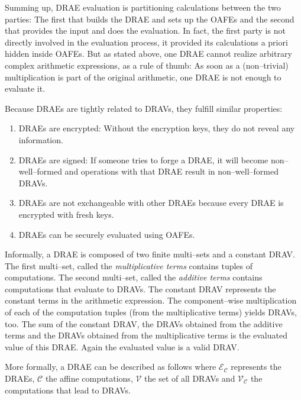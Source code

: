 Summing up, DRAE evaluation is partitioning calculations between the two
parties: The first that builds the DRAE and sets up the OAFEs and the second
that provides the input and does the evaluation. In fact, the first party is not
directly involved in the evaluation process, it provided its calculations a
priori hidden inside OAFEs. But as stated above, one DRAE cannot realize
arbitrary complex arithmetic expressions, as a rule of thumb: As soon as a
(non--trivial) multiplication is part of the original arithmetic, one DRAE is
not enough to evaluate it.



Because DRAEs are tightly related to DRAVs, they fulfill similar properties:

\begin{enumerate}

  \item \label{prop:drae-encrypted} DRAEs are encrypted: Without the encryption
    keys, they do not reveal any information.

  \item \label{prop:drae-signed} DRAEs are signed: If someone tries to forge a
    DRAE, it will become non--well--formed and operations with that DRAE result
    in non--well--formed DRAVs.

  \item DRAEs are not exchangeable with other DRAEs because every DRAE is
    encrypted with fresh keys.

  \item \label{prop:drae-oafe} DRAEs can be securely evaluated using OAFEs.

\end{enumerate}

\noindent{}Informally, a DRAE is composed of two finite multi--sets and a
constant DRAV\@. The first multi--set, called the \emph{multiplicative terms}
contains tuples of computations. The second multi--set, called the
\emph{additive terms} contains computations that evaluate to DRAVs. The constant
DRAV represents the constant terms in the arithmetic expression. The
component--wise multiplication of each of the computation tuples (from the
multiplicative terms) yields DRAVs, too. The sum of the constant DRAV, the DRAVs
obtained from the additive terms and the DRAVs obtained from the multiplicative
terms is the evaluated value of this DRAE\@. Again the evaluated value is a
valid DRAV\@.

More formally, a DRAE can be described as follows where
$\mathcal{E}_\mathcal{C}$ represents the DRAEs, $\mathcal{C}$ the affine
computations, $\mathcal{V}$ the set of all DRAVs and $\mathcal{V}_\mathcal{C}$
the computations that lead to DRAVs.

